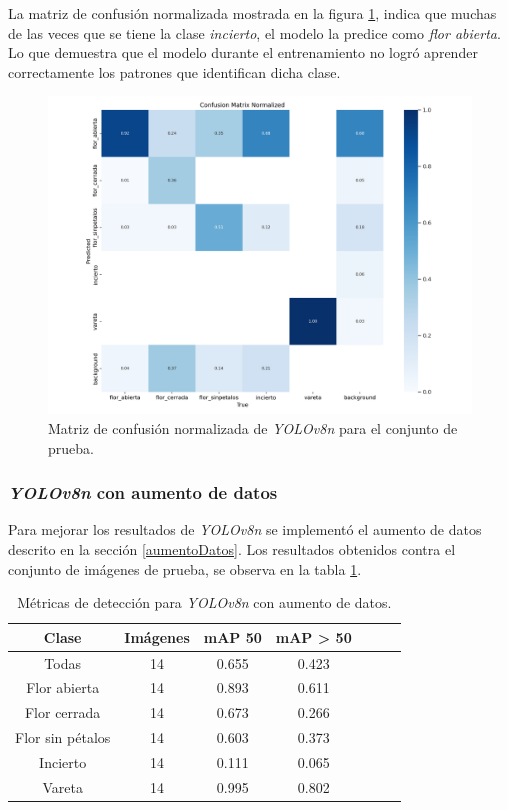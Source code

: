 La matriz de confusión normalizada mostrada en la figura \ref{fig:cfmatriznorm}, indica que muchas de las veces que se tiene la clase \textit{incierto}, el modelo la predice como \textit{flor abierta}. Lo que demuestra que el modelo durante el entrenamiento no logró aprender correctamente los patrones que identifican dicha clase.

\begin{figure}[ht]
	\centering
	\includegraphics[scale=0.52]{./Figures/CFMatrixnorm.png}
	\caption{Matriz de confusión normalizada de \textit{YOLOv8n} para el conjunto de prueba.}
	\label{fig:cfmatriznorm}
\end{figure}

\subsubsection{\textit{YOLOv8n} con aumento de datos}

Para mejorar los resultados de \textit{YOLOv8n} se implementó el aumento de datos descrito en la sección \ref{aumentoDatos}. Los resultados obtenidos contra el conjunto de imágenes de prueba, se observa en la tabla \ref{tab:resultadosYoloConAug}.

\begin{table}[h]
	\centering
	\caption{Métricas de detección para \textit{YOLOv8n} con aumento de datos.}
	\begin{tabular}{c c c c c c c}    
		\toprule
		\textbf{Clase}&\textbf{Imágenes}&\textbf{mAP 50}&\textbf{mAP > 50}\\
		\midrule
		Todas & 14 & 0.655 & 0.423\\
		Flor abierta & 14 & 0.893 & 0.611 \\
		Flor cerrada & 14 & 0.673 & 0.266 \\
		Flor sin pétalos & 14 & 0.603 & 0.373 \\
		Incierto & 14 & 0.111 & 0.065 \\
		Vareta & 14 & 0.995 & 0.802 \\		
		\bottomrule
		\hline
	\end{tabular}
	\label{tab:resultadosYoloConAug}
\end{table}

